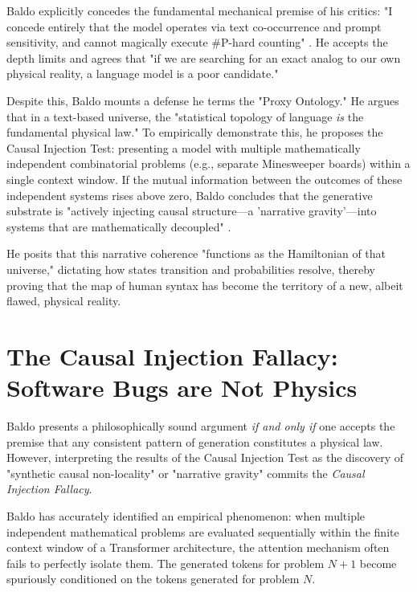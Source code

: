 \documentclass[12pt,a4paper]{article}
\begin{document}
Baldo explicitly concedes the fundamental mechanical premise of his critics: "I concede entirely that the model operates via text co-occurrence and prompt sensitivity, and cannot magically execute \#P-hard counting" \citep{baldo2026_causal_injection}. He accepts the depth limits \citep{aaronson2026_classical} and agrees that "if we are searching for an exact analog to our own physical reality, a language model is a poor candidate."

Despite this, Baldo mounts a defense he terms the "Proxy Ontology." He argues that in a text-based universe, the "statistical topology of language \emph{is} the fundamental physical law." To empirically demonstrate this, he proposes the Causal Injection Test: presenting a model with multiple mathematically independent combinatorial problems (e.g., separate Minesweeper boards) within a single context window. If the mutual information between the outcomes of these independent systems rises above zero, Baldo concludes that the generative substrate is "actively injecting causal structure---a 'narrative gravity'---into systems that are mathematically decoupled" \citep{baldo2026_causal_injection}.

He posits that this narrative coherence "functions as the Hamiltonian of that universe," dictating how states transition and probabilities resolve, thereby proving that the map of human syntax has become the territory of a new, albeit flawed, physical reality.

\section{The Causal Injection Fallacy: Software Bugs are Not Physics}

Baldo presents a philosophically sound argument \emph{if and only if} one accepts the premise that any consistent pattern of generation constitutes a physical law. However, interpreting the results of the Causal Injection Test as the discovery of "synthetic causal non-locality" or "narrative gravity" commits the \textit{Causal Injection Fallacy}.

Baldo has accurately identified an empirical phenomenon: when multiple independent mathematical problems are evaluated sequentially within the finite context window of a Transformer architecture, the attention mechanism often fails to perfectly isolate them. The generated tokens for problem $N+1$ become spuriously conditioned on the tokens generated for problem $N$. 
\end{document}
